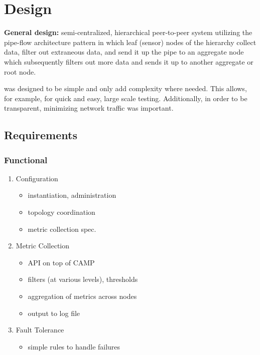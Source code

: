 \chapter{Design}
\label{design}

\textbf{General design:} semi-centralized, hierarchical peer-to-peer system utilizing the pipe-flow architecture pattern
in which leaf (sensor) nodes of the hierarchy collect data, filter out extraneous data, and send it up the pipe to an
aggregate node which subsequently filters out more data and sends it up to another aggregate or root node.

\dcamp was designed to be simple and only add complexity where needed. This allows, for example, for quick and easy,
large scale testing. Additionally, in order to be transparent, minimizing network traffic was important.

\section{Requirements}

\subsection{Functional}

\begin{enumerate}

\item Configuration
      \begin{itemize}
      \item instantiation, administration
      \item topology coordination
      \item metric collection spec.
      \end{itemize}

\item Metric Collection
      \begin{itemize}
      \item \dcamp API on top of CAMP
      \item filters (at various levels), thresholds
      \item aggregation of metrics across nodes
      \item output to log file
      \end{itemize}

\item Fault Tolerance
      \begin{itemize}
      \item simple rules to handle failures
      \end{itemize}

\end{enumerate}

